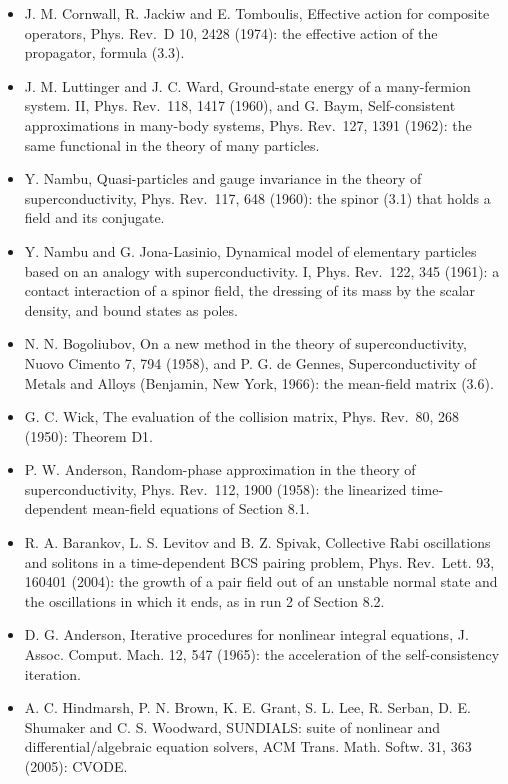 \documentclass[
  10pt,
]{article}
\providecommand{\tightlist}{%
  \setlength{\itemsep}{0pt}\setlength{\parskip}{0pt}}
\begin{document}
\begin{itemize}
\tightlist
\item
  J. M. Cornwall, R. Jackiw and E. Tomboulis, Effective action for
  composite operators, Phys. Rev.~D 10, 2428 (1974): the effective
  action of the propagator, formula (3.3).
\item
  J. M. Luttinger and J. C. Ward, Ground-state energy of a many-fermion
  system. II, Phys. Rev.~118, 1417 (1960), and G. Baym, Self-consistent
  approximations in many-body systems, Phys. Rev.~127, 1391 (1962): the
  same functional in the theory of many particles.
\item
  Y. Nambu, Quasi-particles and gauge invariance in the theory of
  superconductivity, Phys. Rev.~117, 648 (1960): the spinor (3.1) that
  holds a field and its conjugate.
\item
  Y. Nambu and G. Jona-Lasinio, Dynamical model of elementary particles
  based on an analogy with superconductivity. I, Phys. Rev.~122, 345
  (1961): a contact interaction of a spinor field, the dressing of its
  mass by the scalar density, and bound states as poles.
\item
  N. N. Bogoliubov, On a new method in the theory of superconductivity,
  Nuovo Cimento 7, 794 (1958), and P. G. de Gennes, Superconductivity of
  Metals and Alloys (Benjamin, New York, 1966): the mean-field matrix
  (3.6).
\item
  G. C. Wick, The evaluation of the collision matrix, Phys. Rev.~80, 268
  (1950): Theorem D1.
\item
  P. W. Anderson, Random-phase approximation in the theory of
  superconductivity, Phys. Rev.~112, 1900 (1958): the linearized
  time-dependent mean-field equations of Section 8.1.
\item
  R. A. Barankov, L. S. Levitov and B. Z. Spivak, Collective Rabi
  oscillations and solitons in a time-dependent BCS pairing problem,
  Phys. Rev.~Lett. 93, 160401 (2004): the growth of a pair field out of
  an unstable normal state and the oscillations in which it ends, as in
  run 2 of Section 8.2.
\item
  D. G. Anderson, Iterative procedures for nonlinear integral equations,
  J. Assoc. Comput. Mach. 12, 547 (1965): the acceleration of the
  self-consistency iteration.
\item
  A. C. Hindmarsh, P. N. Brown, K. E. Grant, S. L. Lee, R. Serban, D. E.
  Shumaker and C. S. Woodward, SUNDIALS: suite of nonlinear and
  differential/algebraic equation solvers, ACM Trans. Math. Softw. 31,
  363 (2005): CVODE.
\end{itemize}
\end{document}
